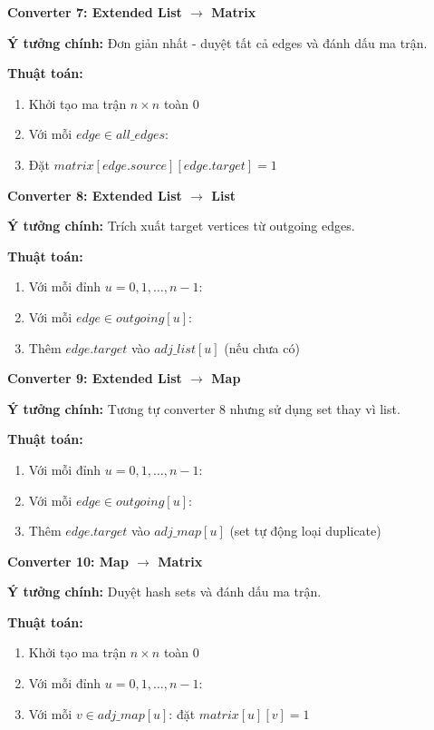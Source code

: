 \documentclass[12pt,a4paper]{article}
\begin{document}
\textbf{Converter 7: Extended List $\rightarrow$ Matrix}

\textbf{Ý tưởng chính:} Đơn giản nhất - duyệt tất cả edges và đánh dấu ma trận.

\textbf{Thuật toán:}
\begin{enumerate}
    \item Khởi tạo ma trận $n \times n$ toàn $0$
    \item Với mỗi $edge \in all\_edges$:
    \item Đặt $matrix[edge.source][edge.target] = 1$
\end{enumerate}
\vspace{0.5cm}

\textbf{Converter 8: Extended List $\rightarrow$ List}

\textbf{Ý tưởng chính:} Trích xuất target vertices từ outgoing edges.

\textbf{Thuật toán:}
\begin{enumerate}
    \item Với mỗi đỉnh $u = 0, 1, \ldots, n-1$:
    \item Với mỗi $edge \in outgoing[u]$:
    \item Thêm $edge.target$ vào $adj\_list[u]$ (nếu chưa có)
\end{enumerate}
\vspace{0.5cm}

\textbf{Converter 9: Extended List $\rightarrow$ Map}

\textbf{Ý tưởng chính:} Tương tự converter 8 nhưng sử dụng set thay vì list.

\textbf{Thuật toán:}
\begin{enumerate}
    \item Với mỗi đỉnh $u = 0, 1, \ldots, n-1$:
    \item Với mỗi $edge \in outgoing[u]$:
    \item Thêm $edge.target$ vào $adj\_map[u]$ (set tự động loại duplicate)
\end{enumerate}
\vspace{0.5cm}

\textbf{Converter 10: Map $\rightarrow$ Matrix}

\textbf{Ý tưởng chính:} Duyệt hash sets và đánh dấu ma trận.

\textbf{Thuật toán:}
\begin{enumerate}
    \item Khởi tạo ma trận $n \times n$ toàn $0$
    \item Với mỗi đỉnh $u = 0, 1, \ldots, n-1$:
    \item Với mỗi $v \in adj\_map[u]$: đặt $matrix[u][v] = 1$
\end{enumerate}
\vspace{0.5cm}
\end{document}
